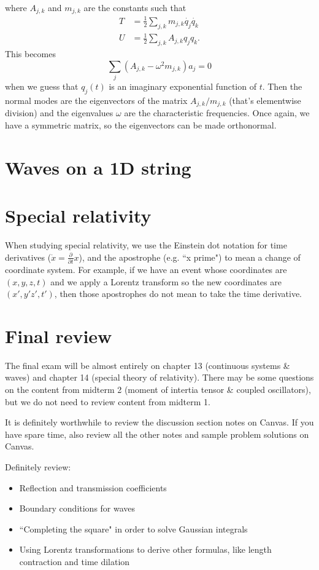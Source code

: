\documentclass{article}
\begin{document}
where $A_{j,k}$ and $m_{j,k}$ are the constants such that
\begin{align*}
    T &= \frac{1}{2} \sum_{j,k} m_{j,k} \dot{q_j} \dot{q_k} \\
    U &= \frac{1}{2} \sum_{j,k} A_{j,k} q_j q_k.
\end{align*}
This becomes
\[ \sum_j \left( A_{j,k} - \omega^2 m_{j,k} \right)a_j =0 \]
when we guess that $q_j(t)$ is an imaginary exponential function of $t$. Then the normal modes are the eigenvectors of the matrix $A_{j,k}/m_{j,k}$ (that's elementwise division) and the eigenvalues $\omega$ are the characteristic frequencies. Once again, we have a symmetric matrix, so the eigenvectors can be made orthonormal.

\section{Waves on a 1D string}

\section{Special relativity}
\begin{note}
    When studying special relativity, we use the Einstein dot notation for time derivatives ($\dot{x} = \frac{\partial}{\partial t} x$), and the apostrophe (e.g. ``x prime") to mean a change of coordinate system. For example, if we have an event whose coordinates are $(x,y,z,t)$ and we apply a Lorentz transform so the new coordinates are $(x',y'z',t')$, then those apostrophes do not mean to take the time derivative.
\end{note}

\section{Final review}
The final exam will be almost entirely on chapter 13 (continuous systems \& waves) and chapter 14 (special theory of relativity). There may be some questions on the content from midterm 2 (moment of intertia tensor \& coupled oscillators), but we do not need to review content from midterm 1.
\par
It is definitely worthwhile to review the discussion section notes on Canvas. If you have spare time, also review all the other notes and sample problem solutions on Canvas.
\par
Definitely review:
\begin{itemize}
    \item Reflection and transmission coefficients
    \item Boundary conditions for waves
    \item ``Completing the square" in order to solve Gaussian integrals
    \item Using Lorentz transformations to derive other formulas, like length contraction and time dilation
\end{itemize}
\end{document}

